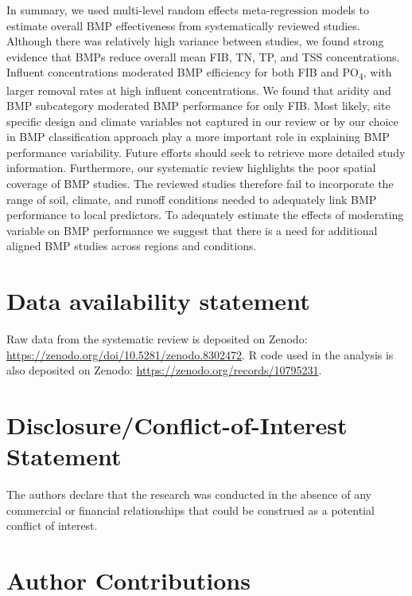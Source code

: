 \documentclass[utf8]{FrontiersinHarvard}
\begin{document}
In summary, we used multi-level random effects meta-regression models to estimate overall BMP effectiveness from systematically reviewed studies.
Although there was relatively high variance between studies, we found strong evidence that BMPs reduce overall mean FIB, TN, TP, and TSS concentrations.
Influent concentrations moderated BMP efficiency for both FIB and PO\textsubscript{4}, with larger removal rates at high influent concentrations.
We found that aridity and BMP subcategory moderated BMP performance for only FIB.
Most likely, site specific design and climate variables not captured in our review or by our choice in BMP classification approach play a more important role in explaining BMP performance variability.
Future efforts should seek to retrieve more detailed study information.
Furthermore, our systematic review highlights the poor spatial coverage of BMP studies.
The reviewed studies therefore fail to incorporate the range of soil, climate, and runoff conditions needed to adequately link BMP performance to local predictors.
To adequately estimate the effects of moderating variable on BMP performance we suggest that there is a need for additional aligned BMP studies across regions and conditions.

\hypertarget{data-availability-statement}{%
\section*{Data availability statement}\label{data-availability-statement}}

Raw data from the systematic review is deposited on Zenodo: \url{https://zenodo.org/doi/10.5281/zenodo.8302472}.
R code used in the analysis is also deposited on Zenodo: \url{https://zenodo.org/records/10795231}.

\hypertarget{disclosureconflict-of-interest-statement}{%
\section*{Disclosure/Conflict-of-Interest Statement}\label{disclosureconflict-of-interest-statement}}

The authors declare that the research was conducted in the absence of any
commercial or financial relationships that could be construed as a potential
conflict of interest.

\hypertarget{author-contributions}{%
\section*{Author Contributions}\label{author-contributions}}
\end{document}
